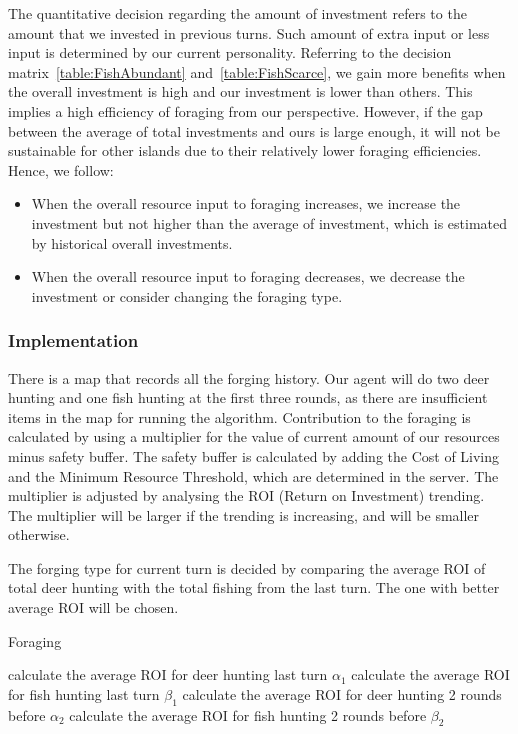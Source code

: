 The quantitative decision regarding the amount of investment refers to the amount that we invested in previous turns. Such amount of extra input or less input is determined by our current personality. Referring to the decision matrix~\ref{table:FishAbundant} and~\ref{table:FishScarce}, we gain more benefits when the overall investment is high and our investment is lower than others. This implies a high efficiency of foraging from our perspective. However, if the gap between the average of total investments and ours is large enough, it will not be sustainable for other islands due to their relatively lower foraging efficiencies. Hence, we follow:
\begin{itemize}
    \item When the overall resource input to foraging increases, we increase the investment but not higher than the average of investment, which is estimated by historical overall investments.
    \item When the overall resource input to foraging decreases, we decrease the investment or consider changing the foraging type.
\end{itemize}


\subsubsection{Implementation} \label{subsubsec:Team6_Foraging:Implementation}
There is a map that records all the forging history. Our agent will do two deer hunting and one fish hunting at the first three rounds, as there are insufficient items in the map for running the algorithm. Contribution to the foraging is calculated by using a multiplier for the value of current amount of our resources minus safety buffer. The safety buffer is calculated by adding the Cost of Living and the Minimum Resource Threshold, which are determined in the server. The multiplier is adjusted by analysing the ROI (Return on Investment) trending. The multiplier will be larger if the trending is increasing, and will be smaller otherwise.

The forging type for current turn is decided by comparing the average ROI of total deer hunting with the total fishing from the last turn. The one with better average ROI will be chosen.

\begin{algorithm}
\caption{Foraging} 
    calculate the average ROI for deer hunting last turn $\alpha_1$\;
    calculate the average ROI for fish hunting last turn  $\beta_1$\;
    calculate the average ROI for deer hunting 2 rounds before $\alpha_2$\;
    calculate the average ROI for fish hunting 2 rounds before $\beta_2$\;
\end{algorithm}

